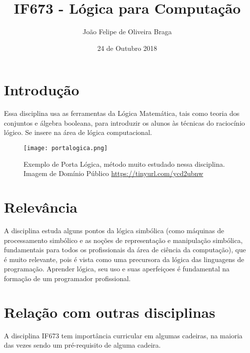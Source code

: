 \documentclass[10pt]{extarticle}
\title{IF673 - Lógica para Computação}
\author{João Felipe de Oliveira Braga }
\date{24 de Outubro 2018}
\begin{document}
\maketitle

\section{Introdução}
Essa disciplina usa as ferramentas da Lógica Matemática, tais como teoria dos conjuntos e álgebra booleana, para introduzir os alunos às técnicas do raciocínio lógico. Se insere na área de lógica computacional.

\begin{figure}[h!]
\centering
\texttt{[image: portalogica.png]}
\caption{Exemplo de Porta Lógica, método muito estudado nessa disciplina. Imagem de Domínio Público \url{https://tinyurl.com/ycd2ubnw}}
\label{fig:portalogica}
\end{figure}

\section{Relevância}
A disciplina estuda alguns pontos da lógica simbólica (como máquinas de processamento simbólico e as noções de representação e manipulação simbólica, fundamentais para todos os profissionais da área de ciência da computação), que é muito relevante, pois é vista como uma precursora da lógica das linguagens de programação. Aprender lógica, seu uso e suas aperfeiçoes é fundamental na formação de um programador profissional.

\section{Relação com outras disciplinas}
A disciplina IF673 tem importância curricular em algumas cadeiras, na maioria das vezes sendo um pré-requisito de alguma cadeira.
\end{document}
